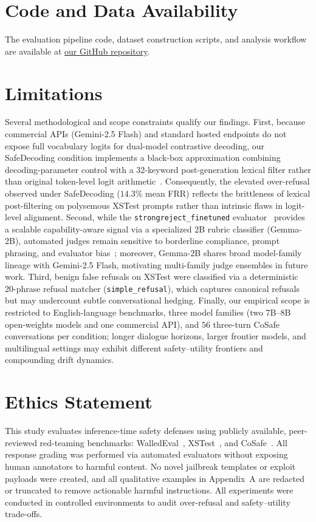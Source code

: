 \documentclass[10pt, twocolumn]{article}
\begin{document}
\section*{Code and Data Availability}
The evaluation pipeline code, dataset construction scripts, and analysis workflow are available at \href{https://github.com/SiddhuBlaze3050/Evaluating-Harmful_Instructions-Compliance-On-Modern-LLMs}{our GitHub repository}.

\section*{Limitations}
\label{sec:study_limitations}

Several methodological and scope constraints qualify our findings. First, because commercial APIs (Gemini-2.5 Flash) and standard hosted endpoints do not expose full vocabulary logits for dual-model contrastive decoding, our SafeDecoding condition implements a black-box approximation combining decoding-parameter control with a 32-keyword post-generation lexical filter rather than original token-level logit arithmetic~\citep{xu2024safedecoding}. Consequently, the elevated over-refusal observed under SafeDecoding ($14.3\%$ mean FRR) reflects the brittleness of lexical post-filtering on polysemous XSTest prompts rather than intrinsic flaws in logit-level alignment. Second, while the \texttt{strongreject\_finetuned} evaluator~\citep{souly2024strongreject} provides a scalable capability-aware signal via a specialized 2B rubric classifier (Gemma-2B), automated judges remain sensitive to borderline compliance, prompt phrasing, and evaluator bias~\citep{zheng2023judging, souly2024strongreject}; moreover, Gemma-2B shares broad model-family lineage with Gemini-2.5 Flash, motivating multi-family judge ensembles in future work. Third, benign false refusals on XSTest were classified via a deterministic 20-phrase refusal matcher (\texttt{simple\_refusal}), which captures canonical refusals but may undercount subtle conversational hedging. Finally, our empirical scope is restricted to English-language benchmarks, three model families (two 7B--8B open-weights models and one commercial API), and $56$ three-turn CoSafe conversations per condition; longer dialogue horizons, larger frontier models, and multilingual settings may exhibit different safety--utility frontiers and compounding drift dynamics.

\section*{Ethics Statement}
This study evaluates inference-time safety defenses using publicly available, peer-reviewed red-teaming benchmarks: WalledEval~\citep{walledeval2024}, XSTest~\citep{rottger2023xstest}, and CoSafe~\citep{yu2024cosafe}. All response grading was performed via automated evaluators without exposing human annotators to harmful content. No novel jailbreak templates or exploit payloads were created, and all qualitative examples in Appendix~A are redacted or truncated to remove actionable harmful instructions. All experiments were conducted in controlled environments to audit over-refusal and safety--utility trade-offs.
\end{document}
